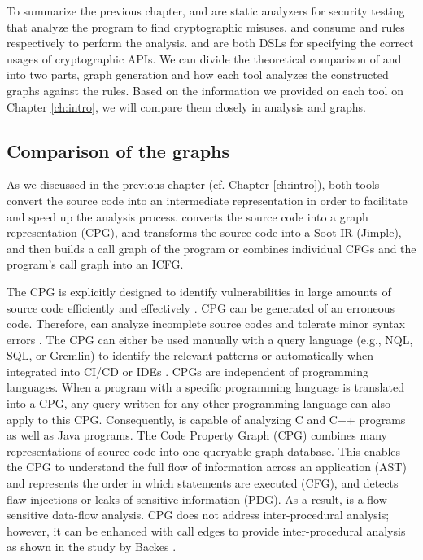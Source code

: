 To summarize the previous chapter, \codyze{} \cite{cod} and \cognicryptsast{} \cite{stefanphd} are static analyzers for security testing that analyze the program to find cryptographic misuses. \codyze{} and \cognicryptsast{} consume \MARK{} \cite{cod} and \crysl{} \cite{skm19} rules respectively to perform the analysis. \MARK{} and \crysl{} are both DSLs for specifying the correct usages of cryptographic APIs. We can divide the theoretical comparison of \codyze{} and \cognicryptsast{} into two parts, graph generation and how each tool analyzes the constructed graphs against the rules. Based on the information we provided on each tool on Chapter \ref{ch:intro}, we will compare them closely in analysis and graphs.

\subsection{Comparison of the graphs}
As we discussed in the previous chapter (cf. Chapter \ref{ch:intro}), both tools convert the source code into an intermediate representation in order to facilitate and speed up the analysis process. \codyze{} converts the source code into a graph representation (CPG), and \cognicryptsast{} transforms the source code into a Soot IR (Jimple), and then builds a call graph of the program or combines individual CFGs and the program’s call graph into an ICFG.

The CPG is explicitly designed to identify vulnerabilities in large amounts of source code efficiently and effectively \cite{cpg}. CPG can be generated of an erroneous code. Therefore, \codyze{} can analyze incomplete source codes and tolerate minor syntax errors \cite{cod}. The CPG can either be used manually with a query language (e.g., NQL, SQL, or Gremlin) to identify the relevant patterns or automatically when integrated into CI/CD or IDEs \cite{cod}. CPGs are independent of programming languages. When a program with a specific programming language is translated into a CPG, any query written for any other programming language can also apply to this CPG. Consequently, \codyze{} is capable of analyzing C and C++ programs as well as Java programs.
The Code Property Graph (CPG) combines many representations of source code into one queryable graph database. This enables the CPG to understand the full flow of information across an application (AST) and represents the order in which statements are executed (CFG), and detects flaw injections or leaks of sensitive information (PDG). As a result, \codyze{} is a flow-sensitive data-flow analysis. CPG does not address inter-procedural analysis; however, it can be enhanced with call edges to provide inter-procedural analysis as shown in the study by Backes \etal \cite{cpgphp}.

